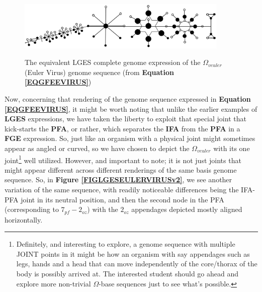 \documentclass[a4paper, 18pt]{book} %
\begin{document}
\begin{figure}[H]
  \begin{center}
   \includegraphics[trim=0cm 0cm 0cm 0cm, clip, width=0.9\textwidth,]{resources/pdfs/PLATONIC-EULERVIRUS-landscape.pdf}\\
   \caption{The equivalent LGES complete genome expression of the $\Omega_{veuler}$ (Euler Virus) genome sequence (from \textbf{Equation \ref{EQGFEEVIRUS}})}
  \label{FIGLGESEULERVIRUS}
  \end{center}
\end{figure}


Now, concerning that rendering of the genome sequence expressed in \textbf{Equation \ref{EQGFEEVIRUS}}, it might be worth noting that unlike the earlier examples of \textbf{LGES} expressions, we have taken the liberty to exploit that special joint that kick-starts the \textbf{PFA}, or rather, which separates the \textbf{IFA} from the \textbf{PFA} in a \textbf{FGE} expression. So, just like an organism with a physical joint might sometimes appear as angled or curved, so we have chosen to depict the $\Omega_{veuler}$ with its one joint\footnote{Definitely, and interesting to explore, a genome sequence with multiple JOINT points in it might be how an organism with say appendages such as legs, hands and a head that can move independently of the core/thorax of the body is possibly arrived at. The interested student should go ahead and explore more non-trivial $\Omega$-base sequences just to see what's possible.} well utilized. However, and important to note; it is not just joints that might appear different across different renderings of the same basis genome sequence. So, in \textbf{Figure \ref{FIGLGESEULERVIRUSv2}}, we see another variation of the same sequence, with readily noticeable differences being the IFA-PFA joint in its neutral position, and then the second node in the PFA (corresponding to \textbf{$7_{pf}-2_{oz}$}) with the $2_{oz}$ appendages depicted mostly aligned horizontally.
\end{document}

